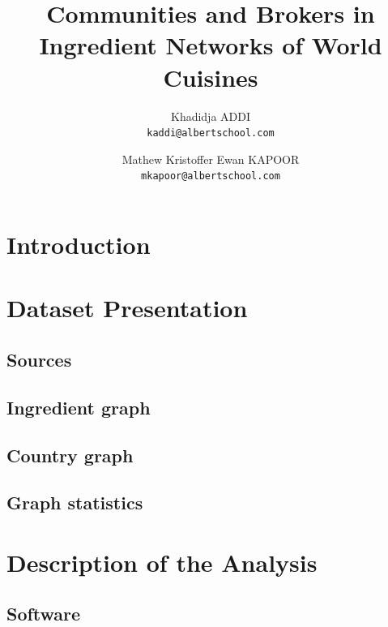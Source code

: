 \documentclass[10pt,a4paper]{article}
\title{Communities and Brokers in Ingredient Networks of World Cuisines}
\author{
  Khadidja ADDI\\
  \texttt{kaddi@albertschool.com}%
  \and
  Mathew Kristoffer Ewan KAPOOR\\
  \texttt{mkapoor@albertschool.com}
}
\date{}
\begin{document}
\maketitle

\begin{abstract}

\end{abstract}

\section{Introduction}


\section{Dataset Presentation}


\subsection{Sources}\label{sec:sources}


\subsection{Ingredient graph}


\subsection{Country graph}


\subsection{Graph statistics}


\section{Description of the Analysis}


\subsection{Software}

\end{document}
